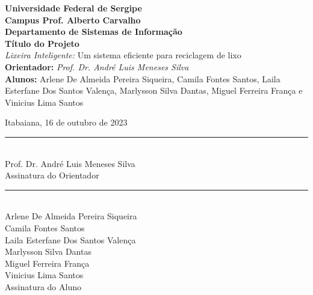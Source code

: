 \documentclass[12pt, oneside, a4paper, dvipdfm fleqn]{article}
\begin{document}
\noindent\textbf{Universidade Federal de Sergipe} \\
\textbf{Campus Prof. Alberto Carvalho}   \\
\textbf{Departamento de Sistemas de Informação} \\

\noindent\textbf{Título do Projeto}\\
\textit {Lixeira Inteligente: }Um sistema eficiente para reciclagem de lixo \\
\noindent\textbf{Orientador:} \textit{Prof. Dr. André Luis Meneses Silva} \\
\textbf{Alunos:} Arlene De Almeida Pereira Siqueira, Camila Fontes Santos, Laila Esterfane Dos Santos Valença, Marlysson Silva Dantas, Miguel Ferreira França e Vinicius Lima Santos \\















\newpage
\singlespacing
\begin{center}
\bigskip
\bigskip 
\bigskip 
\bigskip 
\bigskip 
\bigskip
Itabaiana, 16 de outubro de 2023
\bigskip
\bigskip 
\bigskip 
\bigskip 
\bigskip \\ 
\rule{7cm}{0.4pt} \\
Prof. Dr. André Luis Meneses Silva \\
Assinatura do Orientador
\bigskip
\bigskip 
\bigskip \\
\rule{7cm}{0.4pt} \\
Arlene De Almeida Pereira Siqueira\\
Camila Fontes Santos\\
Laila Esterfane Dos Santos Valença\\
Marlysson Silva Dantas\\
Miguel Ferreira França\\
Vinicius Lima Santos \\
Assinatura do Aluno
\end{center}
\end{document}
